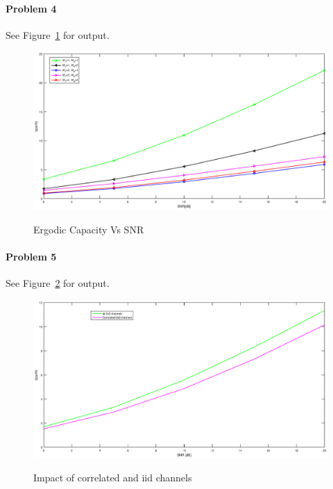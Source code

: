 \documentclass[12pt]{article}
\begin{document}
\paragraph{Problem 4}

See Figure~\ref{fig:er_cap} for output.
\begin{figure}
    \centering
  \includegraphics[width=6.0in]{er_cap.eps}\\
  \caption{Ergodic Capacity Vs SNR}\label{fig:er_cap}
\end{figure}
\paragraph{Problem 5}

See Figure~\ref{fig:cap_crr} for output.
\begin{figure}
    \centering
  \includegraphics[width=6.0in]{cap_crr.eps}\\
  \caption{Impact of correlated and iid channels}\label{fig:cap_crr}
\end{figure}
\end{document}
